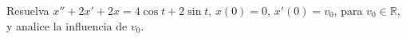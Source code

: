 Resuelva $x''+2x'+2x=4\cos t+2\sin t$, $x(0)=0$, $x'(0)=v_0$, para $v_0\in\mathbb R$, y analice la influencia de $v_0$.

